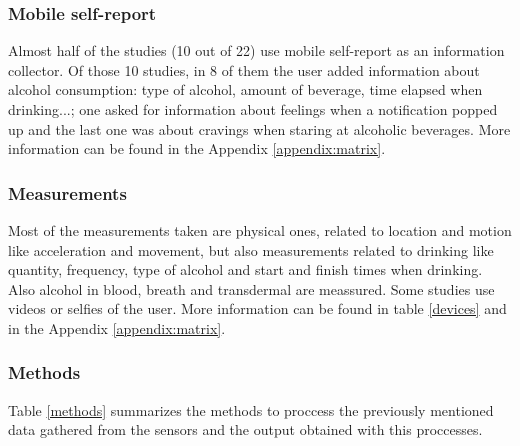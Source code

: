 \subsubsection{Mobile self-report}

Almost half of the studies (10 out of 22) use mobile self-report as an information collector. Of those 10 studies, in 8 of them \cite{Phan2020211,Businelle2020,Leightley2020,Garnett2019296,Leightley2018,Poulton201835,Suffoletto2018116,Bertholet2017285} the user added information about alcohol consumption: type of alcohol, amount of beverage, time elapsed when drinking...; one \cite{Leonard2017} asked for information about feelings when a notification popped up and the last one \cite{Mellentin2017} was about cravings when staring at alcoholic beverages. More information can be found in the Appendix \ref{appendix:matrix}.

\subsubsection{Measurements}

Most of the measurements taken are physical ones, related to location and motion like acceleration and movement, but also measurements related to drinking like quantity, frequency, type of alcohol and start and finish times when drinking. Also alcohol in blood, breath and transdermal are meassured. Some studies use videos \cite{Chatterjee2018} or selfies \cite{Willoughby2019496} of the user. More information can be found in table \ref{devices} and in the Appendix \ref{appendix:matrix}.

\subsubsection{Methods}

Table \ref{methods} summarizes the methods to proccess the previously mentioned data gathered from the sensors and the output obtained with this proccesses.


